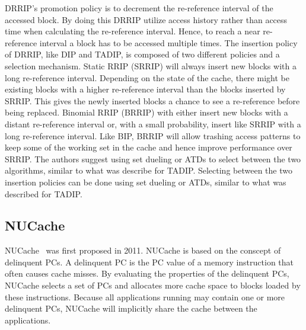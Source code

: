 DRRIP's promotion policy is to decrement the re-reference interval of the accessed block.
By doing this DRRIP utilize access history rather than access time when calculating the re-reference interval.
Hence, to reach a near re-reference interval a block has to be accessed multiple times.
The insertion policy of DRRIP, like DIP and TADIP, is composed of two different policies and a selection mechanism.
Static RRIP (SRRIP) will always insert new blocks with a long re-reference interval. 
Depending on the state of the cache, there might be existing blocks with a higher re-reference interval than the blocks inserted by SRRIP.
This gives the newly inserted blocks a chance to see a re-reference before being replaced.
Binomial RRIP (BRRIP) with either insert new blocks with a distant re-reference interval or, with a small probability, insert like SRRIP with a long re-reference interval.
Like BIP, BRRIP will allow trashing access patterns to keep some of the working set in the cache and hence improve performance over SRRIP.
The authors suggest using set dueling or ATDs to select between the two algorithms, similar to what was describe for TADIP.
Selecting between the two insertion policies can be done using set dueling or ATDs, similar to what was described for TADIP.

\subsection{NUCache}

NUCache~\cite{Manikantan2011} was first proposed in 2011.
NUCache is based on the conscept of delinquent PCs.
A delinquent PC is the PC value of a memory instruction that often causes cache misses.
By evaluating the properties of the delinquent PCs, NUCache selects a set of PCs and allocates more cache space to blocks loaded by these instructions.
Because all applications running may contain one or more delinquent PCs, NUCache will implicitly share the cache between the applications.


